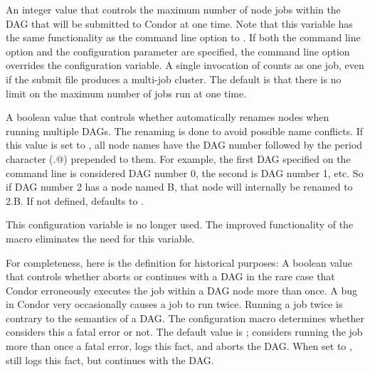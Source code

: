 \begin{description}
\label{param:DAGManMaxJobsSubmitted}
\item[\Macro{DAGMAN\_MAX\_JOBS\_SUBMITTED}]
  An integer value that controls the maximum number of node jobs within the
  DAG that will  be submitted to Condor at one time.  Note that this
  variable has the same functionality as the  
  command line option to .
  If both the command line option and the
  configuration parameter are specified, the command line option overrides
  the configuration variable.  A single invocation of 
  counts as one job, even if the submit file produces a multi-job cluster.
  The default is that there is no limit on the maximum number of jobs
  run at one time.

\label{param:DAGManMungeNodeNames}
\item[\Macro{DAGMAN\_MUNGE\_NODE\_NAMES}]
  A boolean value that controls whether  automatically
  renames nodes when running multiple DAGs.
  The renaming is done to avoid possible name conflicts.
  If this value is set to ,
  all node names have the DAG number followed by the period character
  (\verb@.@) prepended to them.
  For example, the first DAG specified on the 
  command line is considered DAG number 0, the second is DAG number 1, etc.
  So if DAG number 2 has a node named B,
  that node will internally be renamed to 2.B.
  If not defined,  defaults to .

\label{param:DAGManIgnoreDuplicateJobExecution}
\item[\Macro{DAGMAN\_IGNORE\_DUPLICATE\_JOB\_EXECUTION}]
  This configuration variable is no longer used. The improved functionality
  of the  macro eliminates the
  need for this variable.

  For completeness, here is the definition for historical purposes: 
  A boolean value that controls
  whether  aborts or continues with a DAG
  in the rare case that Condor erroneously executes
  the job within a DAG node more than once.
  A bug in Condor very occasionally causes a job to run twice.
  Running a job twice is contrary to the semantics of a DAG.
  The configuration macro 
  determines whether   considers this a fatal error or not.
  The default value is ;  considers
  running the job more than once a fatal error, 
  logs this fact,
  and aborts the DAG.
  When set to ,  still
  logs this fact,
  but continues with the DAG. 


\end{description}
